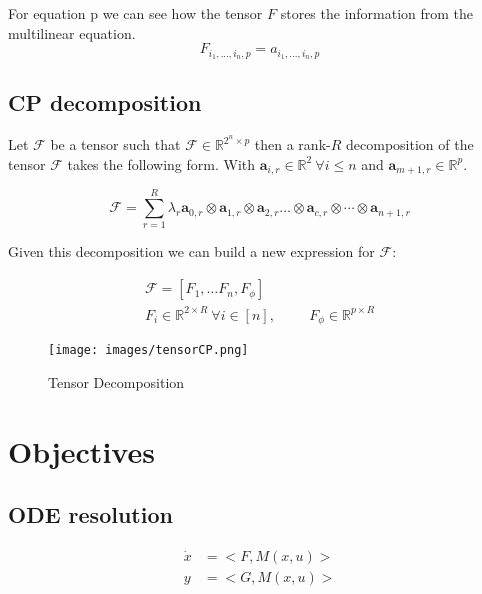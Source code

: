 \documentclass{article}
\begin{document}
For equation p we can see how the tensor $F$ stores the information from the multilinear equation.  
\begin{equation}
    F_{i_1,...,i_n,p} = a_{i_1, ..., i_n, p}
\end{equation}
\subsection{CP decomposition}
Let $\mathcal{F}$ be a tensor such that $\mathcal{F} \in \mathbb{R}^{2^n \times p}$ then a rank-$R$ decomposition of the tensor $\mathcal{F}$ takes the following form. With $\mathbf{a}_{i,r}  \in \mathbb{R}^2 \ \forall i\leq n$ and $\mathbf{a}_{m+1,r}  \in \mathbb{R}^p$. 

\begin{equation}
    \mathcal{F} = \sum_{r=1}^{R} \lambda_r \mathbf{a}_{0,r} \otimes\mathbf{a}_{1,r} \otimes \mathbf{a}_{2,r} \dots \otimes \mathbf{a}_{c,r}\otimes \cdots \otimes \mathbf{a}_{n+1,r}
\end{equation}

Given this decomposition we can build a new expression for $\mathcal{F}$:

\begin{align}
    \mathcal{F} = [F_1, \hdots F_n, F_\phi] \\
    F_i \in \mathbb{R}^{2 \times R} \ \forall i \in [n], \hspace{1cm} F_\phi \in \mathbb{R}^{p \times R}
\end{align}

\begin{figure}[htbp]
  \centering
  \texttt{[image: images/tensorCP.png]}
  \caption{Tensor Decomposition}
  \label{fig:tensorCP}
\end{figure}

\section{Objectives}

\subsection{ODE resolution}

\begin{align}
    \dot{x} &= <F,M(x,u)> \\
    y &= <G,M(x,u)> \\
\end{align}
\end{document}
